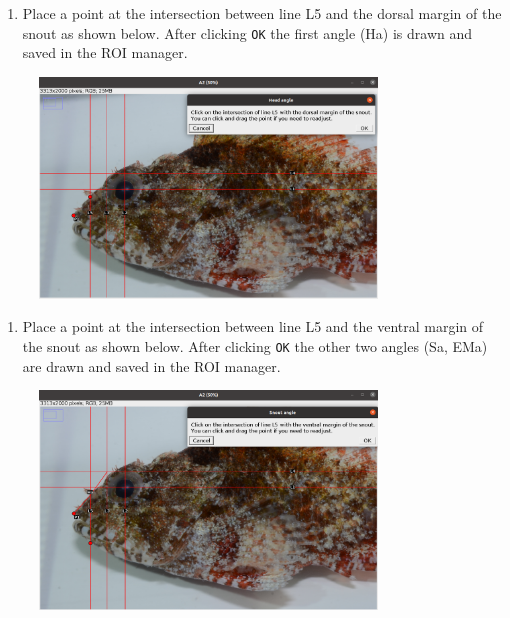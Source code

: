 \documentclass[
  letterpaper,
]{scrbook}
\providecommand{\tightlist}{%
  \setlength{\itemsep}{0pt}\setlength{\parskip}{0pt}}\usepackage{longtable,booktabs,array}
\begin{document}
\begin{enumerate}
\def\labelenumi{\arabic{enumi}.}
\setcounter{enumi}{4}
\tightlist
\item
  Place a point at the intersection between line L5 and the dorsal
  margin of the snout as shown below. After clicking \texttt{OK} the
  first angle (Ha) is drawn and saved in the ROI manager.
\end{enumerate}

\begin{figure}

{\centering \includegraphics[width=0.8\textwidth,height=\textheight]{./images/screenshots/upper_L5_head.png}

}

\end{figure}

\begin{enumerate}
\def\labelenumi{\arabic{enumi}.}
\setcounter{enumi}{5}
\tightlist
\item
  Place a point at the intersection between line L5 and the ventral
  margin of the snout as shown below. After clicking \texttt{OK} the
  other two angles (Sa, EMa) are drawn and saved in the ROI manager.
\end{enumerate}

\begin{figure}

{\centering \includegraphics[width=0.8\textwidth,height=\textheight]{./images/screenshots/lower_L5_head.png}

}

\end{figure}
\end{document}
